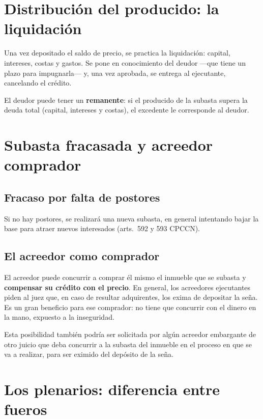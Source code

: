 \documentclass[12pt,oneside]{book}
\begin{document}
\section{Distribución del producido: la liquidación}

Una vez depositado el saldo de precio, se practica la liquidación: capital, intereses, costas y gastos. Se pone en conocimiento del deudor ---que tiene un plazo para impugnarla--- y, una vez aprobada, se entrega al ejecutante, cancelando el crédito.

El deudor puede tener un \textbf{remanente}: si el producido de la subasta supera la deuda total (capital, intereses y costas), el excedente le corresponde al deudor.

\section{Subasta fracasada y acreedor comprador}

\subsection{Fracaso por falta de postores}

Si no hay postores, se realizará una nueva subasta, en general intentando bajar la base para atraer nuevos interesados (arts.~592 y 593 CPCCN).

\subsection{El acreedor como comprador}

El acreedor puede concurrir a comprar él mismo el inmueble que se subasta y \textbf{compensar su crédito con el precio}. En general, los acreedores ejecutantes piden al juez que, en caso de resultar adquirentes, los exima de depositar la seña. Es un gran beneficio para ese comprador: no tiene que concurrir con el dinero en la mano, expuesto a la inseguridad.

Esta posibilidad también podría ser solicitada por algún acreedor embargante de otro juicio que deba concurrir a la subasta del inmueble en el proceso en que se va a realizar, para ser eximido del depósito de la seña.

\section{Los plenarios: diferencia entre fueros}
\end{document}
